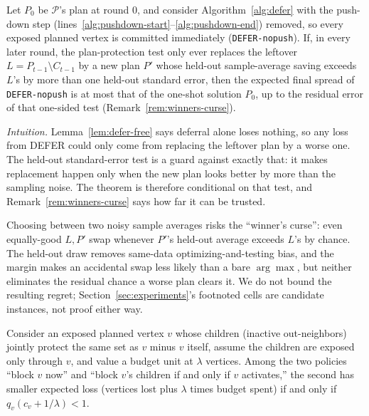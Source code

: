 \documentclass[ijoc,sglanonrev]{informs4}
\begin{document}
\begin{theorem}\label{thm:defer-dominates}
Let $P_0$ be $\mathcal P$'s plan at round $0$, and consider Algorithm~\ref{alg:defer}
with the push-down step (lines~\ref{alg:pushdown-start}--\ref{alg:pushdown-end})
removed, so every exposed planned vertex is committed immediately
(\texttt{DEFER-nopush}). If, in every later round, the plan-protection test
only ever replaces the leftover $L=P_{t-1}\setminus C_{t-1}$ by a new plan
$P'$ whose held-out sample-average saving exceeds $L$'s by more than one
held-out standard error, then the expected final spread of
\texttt{DEFER-nopush} is at most that of the one-shot solution $P_0$, up to
the residual error of that one-sided test (Remark~\ref{rem:winners-curse}).
\end{theorem}

\emph{Intuition.} Lemma~\ref{lem:defer-free} says deferral alone loses
nothing, so any loss from DEFER could only come from replacing the leftover
plan by a worse one. The held-out standard-error test is a guard against
exactly that: it makes replacement happen only when the new plan looks
better by more than the sampling noise. The theorem is therefore
conditional on that test, and Remark~\ref{rem:winners-curse} says how far it
can be trusted.

\begin{remark}\label{rem:winners-curse}
Choosing between two noisy sample averages risks the ``winner's curse'':
even equally-good $L,P'$ swap whenever $P'$'s held-out average exceeds
$L$'s by chance. The held-out draw removes same-data optimizing-and-testing
bias, and the margin makes an accidental swap less likely than a bare
$\arg\max$, but neither eliminates the residual chance a worse plan clears
it. We do not bound the resulting regret; Section~\ref{sec:experiments}'s
footnoted cells are candidate instances, not proof either way.
\end{remark}

\begin{lemma}\label{lem:pushdown}
Consider an exposed planned vertex $v$ whose children (inactive
out-neighbors) jointly protect the same set as $v$ minus $v$ itself, assume
the children are exposed only through $v$, and value a budget unit at
$\lambda$ vertices. Among the two policies ``block $v$ now'' and ``block
$v$'s children if and only if $v$ activates,'' the second has smaller
expected loss (vertices lost plus $\lambda$ times budget spent) if and only
if $q_v(c_v+1/\lambda)<1$.
\end{lemma}
\end{document}
